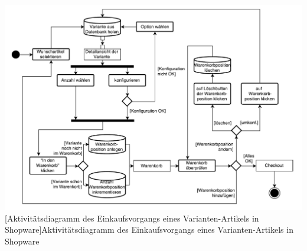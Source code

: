 \documentclass[11pt, a4paper, titlepage, listof=totoc, bibliography=totoc, index=totoc, twoside, openright, headings=normal, draft]{scrreprt}
\begin{document}
\vspace{1em}
\begin{minipage}{\linewidth}
	\centering
	\includegraphics[width=1\linewidth]{Abbildungen/shopwareKonfigurationFlussdiagramm.pdf}
	[Aktivitätsdiagramm des Einkaufsvorgangs eines Varianten-Artikels in Shopware]{Aktivitätsdiagramm des Einkaufsvorgangs eines Varianten-Artikels in Shopware}
	\label{fig:shopwareKonfigurationFlussdiagramm}
\end{minipage}
\vspace{0.3em}
\end{document}
